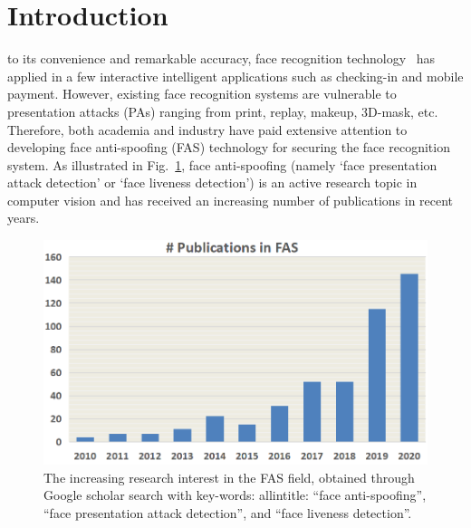 \documentclass[10pt,journal,compsoc]{IEEEtran}
\begin{document}
%
\IEEEpeerreviewmaketitle


\ifCLASSOPTIONcompsoc
{}
\else
\section{Introduction}
\label{sec:introduction}
\fi




 to its convenience and remarkable accuracy, face recognition technology~\cite{guo2020learning} has applied in a few interactive intelligent applications such as checking-in and mobile payment. However, existing face recognition systems are vulnerable to presentation attacks (PAs) ranging from print, replay, makeup, 3D-mask, etc. Therefore, both academia and industry have paid extensive attention to developing face anti-spoofing (FAS) technology for securing the face recognition system. As illustrated in Fig.~\ref{fig:Figure1}, face anti-spoofing (namely `face presentation attack detection' or `face liveness detection') is an active research topic in computer vision and has received an increasing number of publications in recent years.


\begin{figure}
\centering
\includegraphics[scale=0.5]{Figures/Fig1.png}
  \caption{ 
  The increasing research interest in the FAS field, obtained through Google scholar search with key-words: allintitle: “face anti-spoofing”, “face presentation attack detection”, and “face liveness detection”.
  }
\label{fig:Figure1}
\end{figure}
\end{document}
